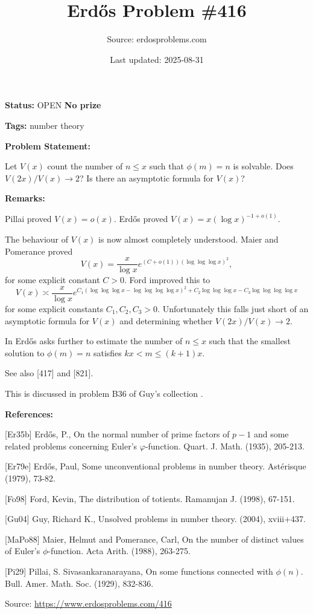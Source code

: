 \documentclass{article}
\title{Erd\H{o}s Problem \#416}
\date{Last updated: 2025-08-31}
\author{Source: erdosproblems.com}
\begin{document}
\maketitle

\noindent\textbf{Status:} OPEN \quad \textbf{No prize}

\noindent\textbf{Tags:} number theory

\medskip
\noindent\textbf{Problem Statement:}

Let $V(x)$ count the number of $n\leq x$ such that $\phi(m)=n$ is solvable. Does $V(2x)/V(x)\to 2$? Is there an asymptotic formula for $V(x)$?

\bigskip
\noindent\textbf{Remarks:}

Pillai \cite{Pi29} proved $V(x)=o(x)$. Erd\H{o}s \cite{Er35b} proved $V(x)=x(\log x)^{-1+o(1)}$. 

The behaviour of $V(x)$ is now almost completely understood. Maier and Pomerance \cite{MaPo88} proved\[V(x)=\frac{x}{\log x}e^{(C+o(1))(\log\log\log x)^2},\]for some explicit constant $C>0$. Ford \cite{Fo98} improved this to\[V(x)\asymp\frac{x}{\log x}e^{C_1(\log\log\log x-\log\log\log\log x)^2+C_2\log\log\log x-C_3\log\log\log\log x}\]for some explicit constants $C_1,C_2,C_3>0$. Unfortunately this falls just short of an asymptotic formula for $V(x)$ and determining whether $V(2x)/V(x)\to 2$.

In \cite{Er79e} Erd\H{o}s asks further to estimate the number of $n\leq x$ such that the smallest solution to $\phi(m)=n$ satisfies $kx<m\leq (k+1)x$. 

See also [417] and [821].

This is discussed in problem B36 of Guy's collection \cite{Gu04}.

\bigskip
\noindent\textbf{References:}

[Er35b] Erd\H{o}s, P., On the normal number of prime factors of $p-1$ and some related problems concerning Euler's $\varphi$-function. Quart. J. Math. (1935), 205-213.
 
 [Er79e] Erd\H{o}s, Paul, Some unconventional problems in number theory. Ast\'{e}risque (1979), 73-82.
 
 [Fo98] Ford, Kevin, The distribution of totients. Ramanujan J. (1998), 67-151.
 
 [Gu04] Guy, Richard K., Unsolved problems in number theory. (2004), xviii+437.
 
 [MaPo88] Maier, Helmut and Pomerance, Carl, On the number of distinct values of Euler's $\phi$-function. Acta Arith. (1988), 263-275.
 
 [Pi29] Pillai, S. Sivasankaranarayana, On some functions connected with {$\phi(n)$}. Bull. Amer. Math. Soc. (1929), 832-836.

\bigskip
\noindent\small{Source: \url{https://www.erdosproblems.com/416}}
\end{document}
